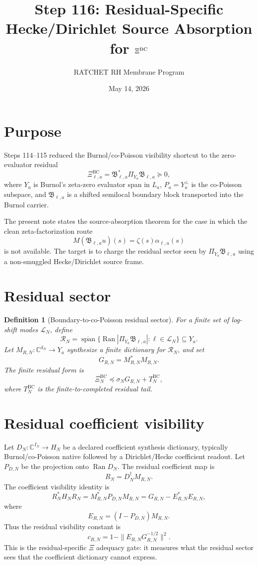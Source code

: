 \documentclass[11pt]{article}
\title{Step 116: Residual-Specific Hecke/Dirichlet Source Absorption for $\Xi^{\rm BC}$}
\author{RATCHET RH Membrane Program}
\date{May 14, 2026}
\newtheorem{definition}{Definition}
\newcommand{\BC}{\mathrm{BC}}
\newcommand{\Ran}{\operatorname{Ran}}
\begin{document}
\maketitle

\section{Purpose}
Steps 114--115 reduced the Burnol/co-Poisson visibility shortcut to the zero-evaluator residual
\[
\Xi^{\BC}_{\ell,a}=\mathfrak B_{\ell,a}^{*}\Pi_{Y_a}\mathfrak B_{\ell,a}\succeq0,
\]
where $Y_a$ is Burnol's zeta-zero evaluator span in $L_a$, $P_a=Y_a^\perp$ is the co-Poisson subspace, and $\mathfrak B_{\ell,a}$ is a shifted semilocal boundary block transported into the Burnol carrier.

The present note states the source-absorption theorem for the case in which the clean zeta-factorization route
\[
M(\mathfrak B_{\ell,a}u)(s)=\zeta(s)\alpha_{\ell,u}(s)
\]
is not available. The target is to charge the residual sector seen by $\Pi_{Y_a}\mathfrak B_{\ell,a}$ using a non-smuggled Hecke/Dirichlet source frame.

\section{Residual sector}
\begin{definition}[Boundary-to-co-Poisson residual sector]
For a finite set of log-shift modes $\mathcal L_N$, define
\[
\mathcal R_N
=\overline{\operatorname{span}}\{\Ran |\Pi_{Y_a}\mathfrak B_{\ell,a}|:\ell\in\mathcal L_N\}\subseteq Y_a.
\]
Let $M_{R,N}:\mathbb C^{d_N}\to Y_a$ synthesize a finite dictionary for $\mathcal R_N$, and set
\[
G_{R,N}=M_{R,N}^*M_{R,N}.
\]
The finite residual form is
\[
\Xi^{\BC}_N\preceq \sigma_N G_{R,N}+T_N^{\BC},
\]
where $T_N^{\BC}$ is the finite-to-completed residual tail.
\end{definition}

\section{Residual coefficient visibility}
Let $D_N:\mathbb C^{I_N}\to H_N$ be a declared coefficient synthesis dictionary, typically Burnol/co-Poisson native followed by a Dirichlet/Hecke coefficient readout. Let $P_{D,N}$ be the projection onto $\Ran D_N$. The residual coefficient map is
\[
R_N=D_N^\dagger M_{R,N}.
\]
The coefficient visibility identity is
\[
R_N^*H_NR_N
=M_{R,N}^*P_{D,N}M_{R,N}
=G_{R,N}-E_{R,N}^*E_{R,N},
\]
where
\[
E_{R,N}=(I-P_{D,N})M_{R,N}.
\]
Thus the residual visibility constant is
\[
c_{R,N}=1-\|E_{R,N}G_{R,N}^{-1/2}\|^2.
\]
This is the residual-specific $\Xi$ adequacy gate: it measures what the residual sector sees that the coefficient dictionary cannot express.
\end{document}
